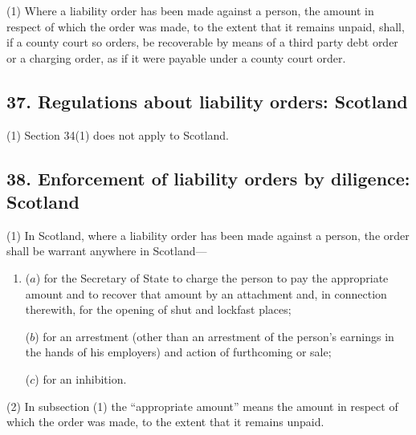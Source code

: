 \documentclass[a4paper]{article}
\begin{document}
(1) Where a liability order has been made against a person, the amount in respect of which the order was made, to the extent that it remains unpaid, shall, if a county court so orders, be recoverable by means of a third party debt order or a charging order, as if it were payable under a county court order.


\subsection{37. Regulations about liability orders: Scotland}

(1) Section 34(1) does not apply to Scotland.


\subsection{38. Enforcement of liability orders by diligence: Scotland}

(1) In Scotland, where a liability order has been made against a person, the order shall be warrant anywhere in Scotland---
\begin{enumerate}\item[]
($a$) for the Secretary of State to charge the person to pay the appropriate amount and to recover that amount by an attachment and, in connection therewith, for the opening of shut and lockfast places;

($b$) for an arrestment (other than an arrestment of the person’s earnings in the hands of his employers) and action of furthcoming or sale;

($c$) for an inhibition.
\end{enumerate}

(2) In subsection (1) the “appropriate amount” means the amount in respect of which the order was made, to the extent that it remains unpaid.
\end{document}
